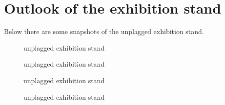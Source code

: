 \section{Outlook of the exhibition stand}
Below there are some snapshots of the unplagged exhibition stand.


\begin{figure}[!h]
  \centering
  \caption{unplagged exhibition stand}
  \label{fig:unplagged_exhibition_stand1}
\end{figure}

\begin{figure}[!h]
  \centering
  \caption{unplagged exhibition stand}
  \label{fig:unplagged_exhibition_stand2}
\end{figure}

\pagebreak 

\begin{figure}[!h]
  \centering
  \caption{unplagged exhibition stand}
  \label{fig:unplagged_exhibition_stand3}
\end{figure}

\begin{figure}[!h]
  \centering
  \caption{unplagged exhibition stand}
  \label{fig:unplagged_exhibition_stand4}
\end{figure}
